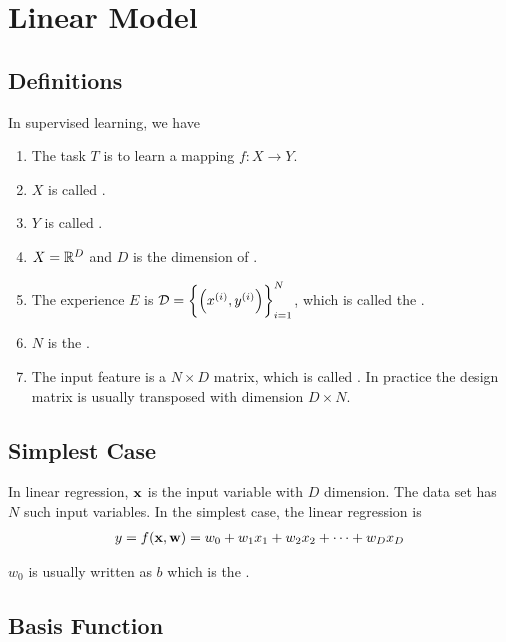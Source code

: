 \chapter{Linear Model}


\section{Definitions}
\begin{definition}
    In supervised learning, we have 
    \begin{enumerate}
        \item The task $T$ is to learn a mapping $f: X \rightarrow Y$.
        \item $X$ is called .
        \item $Y$ is called .
        \item $X = \mathbb{R}^D$ and $D$ is the dimension of .
        \item The experience $E$ is $\mathcal{D} = \set{\left({x}^{(i)}, {y}^{(i)}\right)}_{i=1}^N$, which is called the .
        \item $N$ is the .
        \item The input feature is a $N \times D$ matrix, which is called . In practice the design matrix is usually transposed with dimension $D \times N$.
    \end{enumerate}
\end{definition}


\section{Simplest Case}

In linear regression, $\mathbf{x}$ is the input variable with $D$ dimension. The data set has $N$ such input variables. In the simplest case, the linear regression is
\begin{align}
    y = f(\mathbf{x}, \mathbf{w}) = w_0 + w_1 {x}_{1} + w_2 {x}_{2} + \cdots + w_D {x}_{D}
\end{align}

$w_0$ is usually written as $b$ which is the . 


\section{Basis Function}

